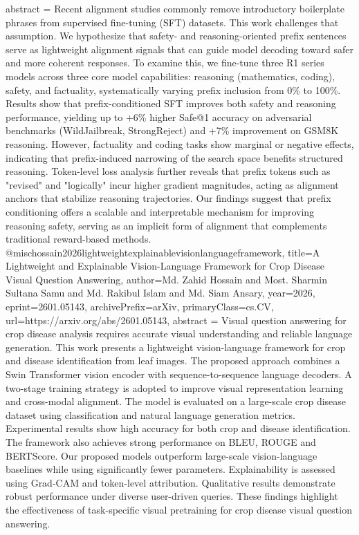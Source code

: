 {      abstract = {Recent alignment studies commonly remove introductory boilerplate phrases from supervised fine-tuning (SFT) datasets. This work challenges that assumption. We hypothesize that safety- and reasoning-oriented prefix sentences serve as lightweight alignment signals that can guide model decoding toward safer and more coherent responses. To examine this, we fine-tune three R1 series models across three core model capabilities: reasoning (mathematics, coding), safety, and factuality, systematically varying prefix inclusion from 0\% to 100\%.   Results show that prefix-conditioned SFT improves both safety and reasoning performance, yielding up to +6\% higher Safe@1 accuracy on adversarial benchmarks (WildJailbreak, StrongReject) and +7\% improvement on GSM8K reasoning. However, factuality and coding tasks show marginal or negative effects, indicating that prefix-induced narrowing of the search space benefits structured reasoning. Token-level loss analysis further reveals that prefix tokens such as "revised" and "logically" incur higher gradient magnitudes, acting as alignment anchors that stabilize reasoning trajectories. Our findings suggest that prefix conditioning offers a scalable and interpretable mechanism for improving reasoning safety, serving as an implicit form of alignment that complements traditional reward-based methods.}
}@misc{hossain2026lightweightexplainablevisionlanguageframework,
      title={A Lightweight and Explainable Vision-Language Framework for Crop Disease Visual Question Answering}, 
      author={Md. Zahid Hossain and Most. Sharmin Sultana Samu and Md. Rakibul Islam and Md. Siam Ansary},
      year={2026},
      eprint={2601.05143},
      archivePrefix={arXiv},
      primaryClass={cs.CV},
      url={https://arxiv.org/abs/2601.05143},
      abstract = {Visual question answering for crop disease analysis requires accurate visual understanding and reliable language generation. This work presents a lightweight vision-language framework for crop and disease identification from leaf images. The proposed approach combines a Swin Transformer vision encoder with sequence-to-sequence language decoders. A two-stage training strategy is adopted to improve visual representation learning and cross-modal alignment. The model is evaluated on a large-scale crop disease dataset using classification and natural language generation metrics. Experimental results show high accuracy for both crop and disease identification. The framework also achieves strong performance on BLEU, ROUGE and BERTScore. Our proposed models outperform large-scale vision-language baselines while using significantly fewer parameters. Explainability is assessed using Grad-CAM and token-level attribution. Qualitative results demonstrate robust performance under diverse user-driven queries. These findings highlight the effectiveness of task-specific visual pretraining for crop disease visual question answering.}
}
